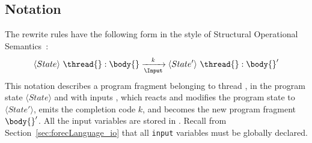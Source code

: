
\subsection{Notation}
The rewrite rules have the following form in the style of 
Structural Operational Semantics~\cite{semantics_sos}:
\begin{equation*}
	\langle State \rangle ~ \thread{}:\body{} 
		\xrightarrow[\Input]{~~k~~} 
	\langle State' \rangle ~ \thread{}:\body{}'
\end{equation*}
This notation describes a program fragment \body{} belonging to thread \thread{},
in the program state $\langle State \rangle$ and with inputs \Input{}, which
reacts and modifies the program state to $\langle State' \rangle$, emits the 
completion code $k$, and becomes the new program fragment $\body{}'$. 
All the input variables are stored in \Input{}. Recall 
from Section~\ref{sec:forecLanguage_io} that all \verb$input$ variables 
must be globally declared.


